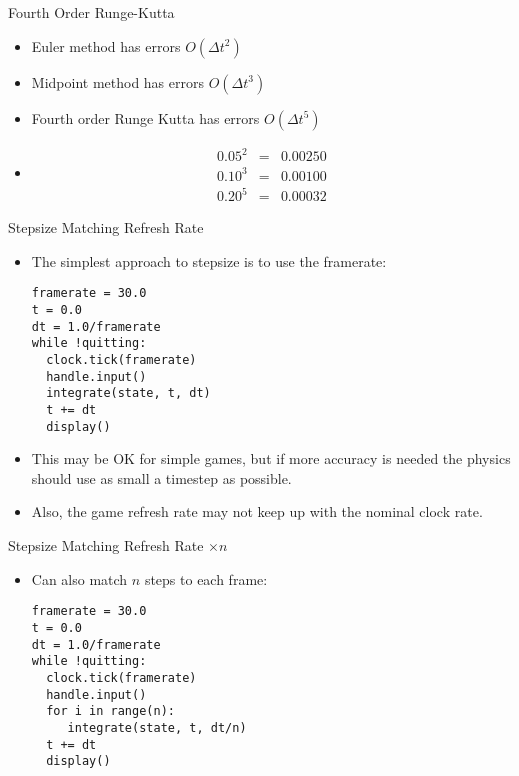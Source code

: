 \documentclass[handout,t,compress]{beamer}
\newcommand{\bframe}[1]{\begin{frame}[fragile]{#1}}
\begin{document}
\bframe{ Fourth Order Runge-Kutta}
\begin{itemize}
\item
Euler method has errors $O(\Delta t^2)$
\item
Midpoint method has errors $O(\Delta t^3)$
\item
Fourth order Runge Kutta has errors $O(\Delta t^5)$
\item
\begin{eqnarray*}
0.05^2 &=& 0.00250\\
0.10^3 &=& 0.00100\\
0.20^5 &=& 0.00032
\end{eqnarray*}
\end{itemize}

\end{frame}

\bframe{Stepsize Matching Refresh Rate}
\begin{itemize}
\item The simplest approach to stepsize is to use the framerate:
  \begin{Verbatim}[frame=single]
framerate = 30.0
t = 0.0
dt = 1.0/framerate
while !quitting:
  clock.tick(framerate)
  handle.input()
  integrate(state, t, dt)
  t += dt
  display()
\end{Verbatim}

\item This may be OK for simple games, but if more accuracy is
  needed the physics should use as small a timestep as possible.
\item Also, the game refresh rate may not keep up with the nominal
  clock rate.
\end{itemize}
\end{frame}


\bframe{Stepsize Matching Refresh Rate $\times n$}
\begin{itemize}
\item Can also match $n$ steps to each frame:
  \begin{Verbatim}[frame=single]
framerate = 30.0
t = 0.0
dt = 1.0/framerate
while !quitting:
  clock.tick(framerate)
  handle.input()
  for i in range(n):
     integrate(state, t, dt/n)
  t += dt
  display()
\end{Verbatim}

\end{itemize}
\end{frame}
\end{document}
